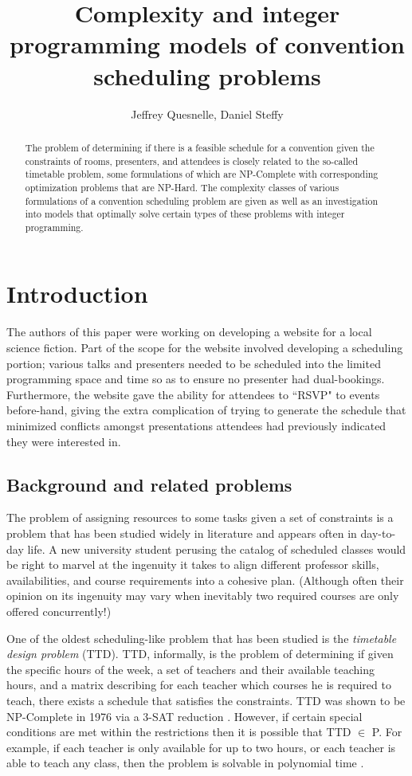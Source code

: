 \documentclass[]{article}
\title{Complexity and integer programming models of convention scheduling problems}
\author{Jeffrey Quesnelle, Daniel Steffy}
\theoremstyle{definition}
\theoremstyle{remark}
\numberwithin{equation}{section}
\begin{document}
\maketitle

\begin{abstract}
The problem of determining if there is a feasible schedule for a convention given the constraints of rooms, presenters, and attendees is closely related to the so-called timetable problem, some formulations of which are NP-Complete with corresponding optimization problems that are NP-Hard. The complexity classes of various formulations of a convention scheduling problem are given as well as an investigation into models that optimally solve certain types of these problems with integer programming.
\end{abstract}

\section{Introduction}

The authors of this paper were working on developing a website for a local science fiction. Part of the scope for the website involved developing a scheduling portion; various talks and presenters needed to be scheduled into the limited programming space and time so as to ensure no presenter had dual-bookings. Furthermore, the website gave the ability for attendees to ``RSVP" to events before-hand, giving the extra complication of trying to generate the schedule that minimized conflicts amongst presentations attendees had previously indicated they were interested in.

\subsection{Background and related problems}
The problem of assigning resources to some tasks given a set of constraints is a problem that has been studied widely in literature and appears often in day-to-day life. A new university student perusing the catalog of scheduled classes would be right to marvel at the ingenuity it takes to align different professor skills, availabilities, and course requirements into a cohesive plan. (Although often their opinion on its ingenuity may vary when inevitably two required courses are only offered concurrently!)  

One of the oldest scheduling-like problem that has been studied is the \emph{timetable design problem} (TTD). TTD, informally, is the problem of determining if given the specific hours of the week, a set of teachers and their available teaching hours, and a matrix describing for each teacher which courses he is required to teach, there exists a schedule that satisfies the constraints. TTD was shown to be NP-Complete in 1976 via a 3-SAT reduction \cite{even76}. However, if certain special conditions are met within the restrictions then it is possible that TTD $\in$ P. For example, if each teacher is only available for up to two hours, or each teacher is able to teach any class, then the problem is solvable in polynomial time \cite{garey76}.
\end{document}
